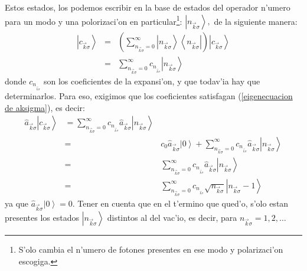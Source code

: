 Estos estados, los podemos escribir en la base de estados del operador
n'umero para un modo y una polorizaci'on en particular\footnote{S'olo
cambia el n'umero de fotones presentes en ese modo y polarizaci'on
escogiga.}: $\left| n_{\vec{k}\sigma}\right> ,$ de la siguiente
manera:%
\begin{eqnarray}
\left| c_{\vec{k}\sigma}\right> & = &\left( \sum_{n_{\vec{k}\sigma
}=0}^{\infty}\left| n_{\vec{k}\sigma}\right> \left\langle n_{\vec
{k}\sigma}\right| \right) \left| c_{\vec{k}\sigma}\right>
\nonumber\\
& = &\sum_{n_{\vec{k}\sigma}=0}^{\infty}c_{n_{_{\vec{k}\sigma}}}\left|
n_{\vec{k}\sigma}\right> \label{glauber en |n>}%
\end{eqnarray}
donde $c_{n_{_{\vec{k}\sigma}}}$ son los coeficientes de la expansi'on, y
que todav'ia hay que determinarlos. Para eso, exigimos que los
coeficientes satisfagan (\ref{eigenecuacion de aksigma}), es decir:%
\begin{eqnarray}
\hat{a}_{\vec{k}\sigma}\left| c_{\vec{k}\sigma}\right> &
=\sum_{n_{\vec{k}\sigma}=0}^{\infty}c_{n_{_{\vec{k}\sigma}}}\hat{a}_{\vec
{k}\sigma}\left| n_{\vec{k}\sigma}\right> \label{glauber 1}\\
& = &c_{0}\hat{a}_{\vec{k}\sigma}\left| 0\right> +\sum_{n_{\vec
{k}\sigma}=0}^{\infty}c_{n_{_{\vec{k}\sigma}}}\hat{a}_{\vec{k}\sigma
}\left| n_{\vec{k}\sigma}\right> \nonumber\\
& = &\sum_{n_{\vec{k}\sigma}=0}^{\infty}c_{n_{_{\vec{k}\sigma}}}\hat{a}_{\vec
{k}\sigma}\left| n_{\vec{k}\sigma}\right> \nonumber\\
& = &\sum_{n_{\vec{k}\sigma}=0}^{\infty}c_{n_{_{\vec{k}\sigma}}}\sqrt{n_{\vec
{k}\sigma}}\left| n_{\vec{k}\sigma}-1\right> \nonumber
\end{eqnarray}
ya que $\hat{a}_{\vec{k}\sigma}\left| 0\right> =0$. Tener en cuenta
que en el t'ermino que qued'o, s'olo estan presentes los estados
$\left| n_{\vec{k}\sigma}\right> $ distintos al del vac'io, es
decir, para $n_{\vec{k}\sigma}=1,2,\dots$

